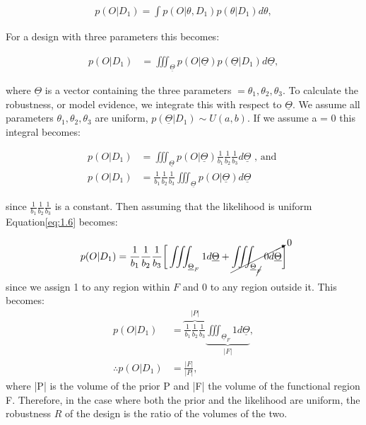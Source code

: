 \begin{align}
p(O|D_1) = \int p(O|\theta,D_1)p(\theta|D_1)d\theta,
\end{align}

\noindent For a design with three parameters this becomes:

\begin{align}
p(O|D_1) &= \displaystyle \iiint_{\underline{\Theta}} p(O|\underline{\Theta})p(\underline{\Theta}|D_1)d\underline{\Theta},
\end{align}

\noindent where $\underline{\Theta}$ is a vector containing the three parameters $ = \theta_1, \theta_2,\theta_3$. To calculate the robustness, or model evidence, we integrate this with respect to $\underline{\Theta}$. We assume  all parameters $\theta_1, \theta_2,\theta_3$ are uniform, $p(\underline{\Theta}|D_1) \sim U(a, b)$. If we assume a = 0 this integral becomes:

\begin{align}
p(O|D_1) &= \displaystyle \iiint_{\underline{\Theta}} p(O|\underline{\Theta})\frac{1}{b_1}\frac{1}{b_2}\frac{1}{b_3}d\underline{\Theta} \text{ , and }\\
p(O|D_1) &= \frac{1}{b_1}\frac{1}{b_2}\frac{1}{b_3} \displaystyle \iiint_{\underline{\Theta}}p(O|\underline{\Theta})d\underline{\Theta} \label{eq:1.6}
\end{align}

\noindent since $\frac{1}{b_1}\frac{1}{b_2}\frac{1}{b_3} $ is a constant. Then assuming that the likelihood is uniform Equation\ref{eq:1.6} becomes:

\begin{align}
p(O|D_1) &= \frac{1}{b_1}\frac{1}{b_2}\frac{1}{b_3} \bigg[\displaystyle \iiint_{\underline{\Theta}_F} 1 d\underline{\Theta} +\cancelto{0}{\displaystyle \iiint_{\underline{\Theta}_{\cancel{F} }} 0 d\underline{\Theta}}\bigg]  \\
\end{align}
\noindent since we assign 1 to any region within $F$ and 0 to any region outside it. This becomes:
\begin{align}
p(O|D_1) &= \overbrace{\frac{1}{b_1}\frac{1}{b_2}\frac{1}{b_3}}^{|P|} \underbrace{\displaystyle \iiint_{\underline{\Theta}_F} 1 d\underline{\Theta}}_{|F|}, \\
\therefore p(O|D_1) &= \frac{|F|}{|P|},
\end{align}
where |P| is the volume of the prior P and |F| the volume of the functional region F. Therefore, in the case where both the prior and the likelihood are uniform, the robustness $R$ of the design is the ratio of the volumes of the two.

